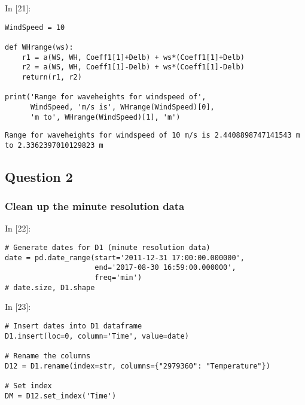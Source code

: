 \documentclass[11pt]{article}
\newif\ifcode
\newif\ifleftmargins
\newlength{\promptlength}
\newcommand{\prompt}[3]{
        \needspace{1.1cm}
        \settowidth{\promptlength}{ #1 [#3] }
        \ifleftmargins\hspace{-\promptlength}\hspace{-5pt}\fi
        {\color{#2}#1 [#3]:}
        \ifleftmargins\vspace{-2.7ex}\fi
    }
\begin{document}
    
\prompt{In}{incolor}{21}
\codetrue
\begin{tcolorbox}[breakable, size=fbox, boxrule=1pt, pad at break*=1mm, colback=cellbackground, colframe=cellborder]
\begin{verbatim}
WindSpeed = 10

def WHrange(ws):
    r1 = a(WS, WH, Coeff1[1]+Delb) + ws*(Coeff1[1]+Delb) 
    r2 = a(WS, WH, Coeff1[1]-Delb) + ws*(Coeff1[1]-Delb) 
    return(r1, r2)

print('Range for waveheights for windspeed of',
      WindSpeed, 'm/s is', WHrange(WindSpeed)[0], 
      'm to', WHrange(WindSpeed)[1], 'm')
\end{verbatim}
\end{tcolorbox}
\codefalse

    \begin{Verbatim}[commandchars=\\\{\}]
Range for waveheights for windspeed of 10 m/s is 2.4408898747141543 m to 2.3362397010129823 m

    \end{Verbatim}

    \hypertarget{question-2}{%
\subsection{Question 2}\label{question-2}}

    \hypertarget{clean-up-the-minute-resolution-data}{%
\subsubsection{Clean up the minute resolution
data}\label{clean-up-the-minute-resolution-data}}

    
\prompt{In}{incolor}{22}
\codetrue
\begin{tcolorbox}[breakable, size=fbox, boxrule=1pt, pad at break*=1mm, colback=cellbackground, colframe=cellborder]
\begin{verbatim}
# Generate dates for D1 (minute resolution data)
date = pd.date_range(start='2011-12-31 17:00:00.000000', 
                     end='2017-08-30 16:59:00.000000', 
                     freq='min')
# date.size, D1.shape
\end{verbatim}
\end{tcolorbox}
\codefalse

    
\prompt{In}{incolor}{23}
\codetrue
\begin{tcolorbox}[breakable, size=fbox, boxrule=1pt, pad at break*=1mm, colback=cellbackground, colframe=cellborder]
\begin{verbatim}
# Insert dates into D1 dataframe
D1.insert(loc=0, column='Time', value=date)

# Rename the columns
D12 = D1.rename(index=str, columns={"2979360": "Temperature"})

# Set index
DM = D12.set_index('Time')
\end{verbatim}
\end{tcolorbox}
\codefalse
\end{document}
